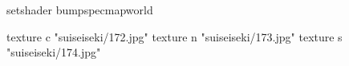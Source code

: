 setshader bumpspecmapworld

    texture c "suiseiseki/172.jpg"
    texture n "suiseiseki/173.jpg"
    texture s "suiseiseki/174.jpg"

